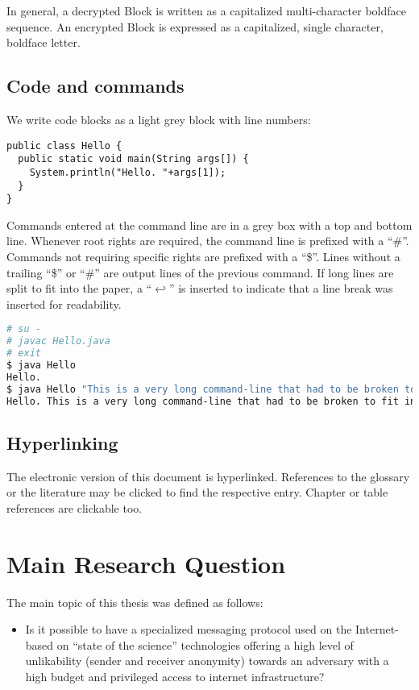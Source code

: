 In general, a decrypted Block is written as a capitalized multi-character boldface sequence. An encrypted Block is expressed as a capitalized, single character, boldface letter.

\section{Code and commands}
We write code blocks as a light grey block with line numbers:

\begin{lstlisting}
public class Hello {
  public static void main(String args[]) {
    System.println("Hello. "+args[1]);
  }
}
\end{lstlisting}

Commands entered at the command line are in a grey box with a top and bottom line. Whenever root rights are required, the command line is prefixed with a ``\#''. Commands not requiring specific rights are prefixed with a ``\$''. Lines without a trailing ``\$'' or ``\#'' are output lines of the previous command. If long lines are split to fit into the paper, a ``$\hookleftarrow$'' is inserted to indicate that a line break was inserted for readability.

\begin{lstlisting}[language=bash]
# su -
# javac Hello.java 
# exit
$ java Hello
Hello.
$ java Hello "This is a very long command-line that had to be broken to fit into the code box displayed on this page."
Hello. This is a very long command-line that had to be broken to fit into the code box displayed on this page.
\end{lstlisting}

\section{Hyperlinking}
The electronic version of this document is hyperlinked. References to the glossary or the literature may be clicked to find the respective entry. Chapter or table references are clickable too. 

\chapter{Main Research Question}
The main topic of this thesis was defined as follows:
\begin{itemize}
	\item Is it possible to have a specialized messaging protocol used on the Internet-based on ``state of the science'' technologies offering a high level of unlikability (sender and receiver anonymity) towards an adversary with a high budget and privileged access to internet infrastructure?
\end{itemize}


